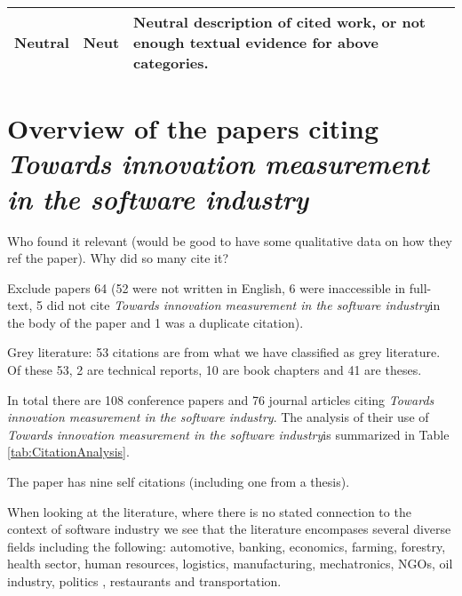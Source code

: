 \documentclass[sigplan]{acmart}
\newcommand{\theArticle}{\textit{Towards innovation measurement in the software industry}}
\begin{document}
\begin{table*}
\begin{tabular}{llp{12cm}}
		\midrule
		Neutral             & Neut         & Neutral description of cited work, or not enough textual evidence for above categories.\\
		\bottomrule
	\end{tabular}
\end{table*}

\section{Overview of the papers citing \theArticle}\label{sec:whocites}
Who found it relevant (would be good to have some qualitative data on how they ref the paper). Why did so many cite it?


Exclude papers 64 (52  were not written in English, 6 were inaccessible in full-text, 5 did not cite \theArticle in the body of the paper and 1 was a duplicate citation).

Grey literature:  53 citations are from what we have classified as grey  literature. Of these 53, 2 are  technical reports, 10 are book chapters and 41 are theses.

In total there are 108 conference papers  and 76 journal articles citing \theArticle. The analysis of their use of \theArticle is summarized in Table \ref{tab:CitationAnalysis}. 

The paper has nine self citations (including one from a thesis). 

When looking at the literature, where there is no stated connection to the context of software industry we see that the literature encompases several diverse fields including the following: automotive, banking, economics, farming, forestry, health sector, human resources, logistics, manufacturing, mechatronics, NGOs, oil industry, politics , restaurants and transportation. 
\end{document}
